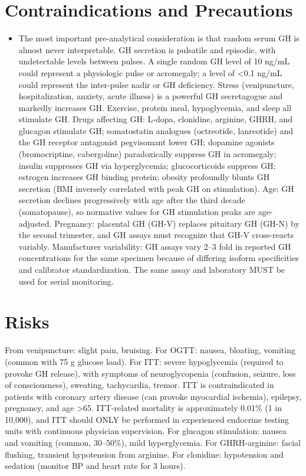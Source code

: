 \section*{Contraindications and Precautions}
\begin{itemize}
  \item The most important pre-analytical consideration is that random serum GH is almost never interpretable. GH secretion is pulsatile and episodic, with undetectable levels between pulses. A single random GH level of 10 ng/mL could represent a physiologic pulse or acromegaly; a level of <0.1 ng/mL could represent the inter-pulse nadir or GH deficiency. Stress (venipuncture, hospitalization, anxiety, acute illness) is a powerful GH secretagogue and markedly increases GH. Exercise, protein meal, hypoglycemia, and sleep all stimulate GH. Drugs affecting GH: L-dopa, clonidine, arginine, GHRH, and glucagon stimulate GH; somatostatin analogues (octreotide, lanreotide) and the GH receptor antagonist pegvisomant lower GH; dopamine agonists (bromocriptine, cabergoline) paradoxically suppress GH in acromegaly; insulin suppresses GH via hyperglycemia; glucocorticoids suppress GH; estrogen increases GH binding protein; obesity profoundly blunts GH secretion (BMI inversely correlated with peak GH on stimulation). Age: GH secretion declines progressively with age after the third decade (somatopause), so normative values for GH stimulation peaks are age-adjusted. Pregnancy: placental GH (GH-V) replaces pituitary GH (GH-N) by the second trimester, and GH assays must recognize that GH-V cross-reacts variably. Manufacturer variability: GH assays vary 2--3 fold in reported GH concentrations for the same specimen because of differing isoform specificities and calibrator standardization. The same assay and laboratory MUST be used for serial monitoring.
\end{itemize}
\section*{Risks}
From venipuncture: slight pain, bruising. For OGTT: nausea, bloating, vomiting (common with 75 g glucose load). For ITT: severe hypoglycemia (required to provoke GH release), with symptoms of neuroglycopenia (confusion, seizure, loss of consciousness), sweating, tachycardia, tremor. ITT is contraindicated in patients with coronary artery disease (can provoke myocardial ischemia), epilepsy, pregnancy, and age >65. ITT-related mortality is approximately 0.01\% (1 in 10,000), and ITT should ONLY be performed in experienced endocrine testing units with continuous physician supervision. For glucagon stimulation: nausea and vomiting (common, 30--50\%), mild hyperglycemia. For GHRH-arginine: facial flushing, transient hypotension from arginine. For clonidine: hypotension and sedation (monitor BP and heart rate for 3 hours).

